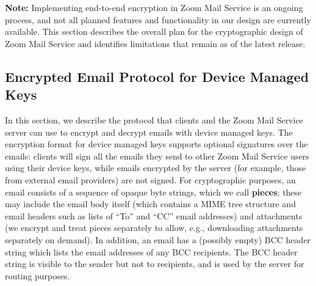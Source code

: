 \textbf{Note:} Implementing end-to-end encryption in Zoom Mail Service is an ongoing process, and
not all planned features and functionality in our design are currently available. This section
describes the overall plan for the cryptographic design of Zoom Mail Service and identifies
limitations that remain as of the latest release.

\subsection{Encrypted Email Protocol for Device Managed Keys}
\label{subsec:emailprotocol}

In this section, we describe the protocol that clients and the Zoom Mail Service server can use to
encrypt and decrypt emails with device managed keys. The encryption format for device managed keys
supports optional signatures over the emails: clients will sign all the emails they send to other
Zoom Mail Service users using their device keys, while emails encrypted by the server (for example,
those from external email providers) are not signed. For cryptographic purposes, an email consists
of a sequence of opaque byte strings, which we call \textbf{pieces}; these may include the email
body itself (which contains a MIME tree structure and email headers such as lists of ``To'' and
``CC'' email addresses) and attachments (we encrypt and treat pieces separately to allow, e.g.,
downloading attachments separately on demand). In addition, an email has a (possibly empty) BCC
header string which lists the email addresses of any BCC recipients. The BCC header string is
visible to the sender but not to recipients, and is used by the server for routing purposes.

